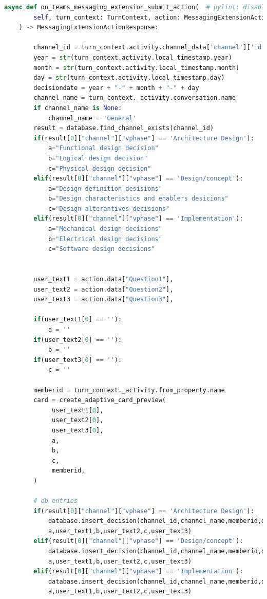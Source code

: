 \begin{lstlisting}[caption={Submit button handling},label={lst:submit},language=python]
async def on_teams_messaging_extension_submit_action(  # pylint: disable=unused-argument
        self, turn_context: TurnContext, action: MessagingExtensionAction
    ) -> MessagingExtensionActionResponse:

        channel_id = turn_context.activity.channel_data['channel']['id']
        year = str(turn_context.activity.local_timestamp.year)
        month = str(turn_context.activity.local_timestamp.month)
        day = str(turn_context.activity.local_timestamp.day)
        decisiondate = year + "-" + month + "-" + day
        channel_name = turn_context._activity.conversation.name
        if channel_name is None:
            channel_name = 'General'
        result = database.find_channel_exists(channel_id)
        if(result[0]["channel"]["vphase"] == 'Architecture Design'):
            a="Functional design decision"
            b="Logical design decision"
            c="Physical design decision"
        elif(result[0]["channel"]["vphase"] == 'Design/concept'):
            a="Design definition desisions"
            b="Design characteristics and enablers desicions"
            c="Design alterantives decisions"
        elif(result[0]["channel"]["vphase"] == 'Implementation'):
            a="Mechanical design decisions"
            b="Electrical design decisions"
            c="Software design decisions"


        user_text1 = action.data["Question1"],
        user_text2 = action.data["Question2"],
        user_text3 = action.data["Question3"],

        if(user_text1[0] == ''):
            a = ''
        if(user_text2[0] == ''):
            b = ''
        if(user_text3[0] == ''):
            c = ''
   
        memberid = turn_context._activity.from_property.name
        card = create_adaptive_card_preview(
             user_text1[0],
             user_text2[0],
             user_text3[0],
             a,
             b,
             c,
             memberid,
        )

        # db entries
        if(result[0]["channel"]["vphase"] == 'Architecture Design'):
            database.insert_decision(channel_id,channel_name,memberid,decisiondate,
            a,user_text1,b,user_text2,c,user_text3)
        elif(result[0]["channel"]["vphase"] == 'Design/concept'):
            database.insert_decision(channel_id,channel_name,memberid,decisiondate,
            a,user_text1,b,user_text2,c,user_text3)
        elif(result[0]["channel"]["vphase"] == 'Implementation'):
            database.insert_decision(channel_id,channel_name,memberid,decisiondate,
            a,user_text1,b,user_text2,c,user_text3)
        


\end{lstlisting}
